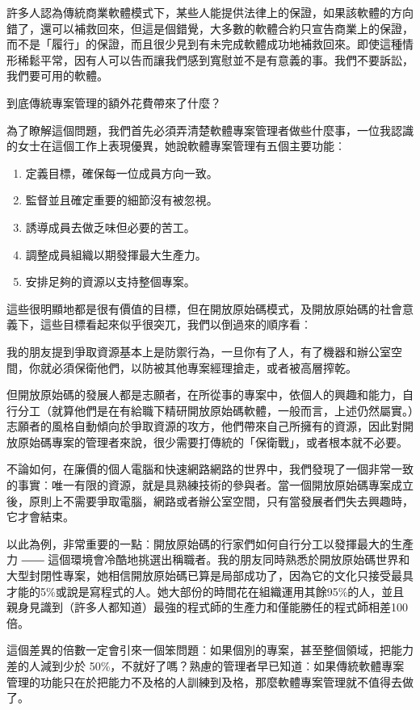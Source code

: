 \documentclass[12pt, a5paper]{book}
\begin{document}
許多人認為傳統商業軟體模式下，某些人能提供法律上的保證，如果該軟體的方向錯了，還可以補救回來，但這是個錯覺，大多數的軟體合約只宣告商業上的保證，而不是「履行」的保證，而且很少見到有未完成軟體成功地補救回來。即使這種情形稀鬆平常，因有人可以告而讓我們感到寬慰並不是有意義的事。我們不要訴訟，我們要可用的軟體。

到底傳統專案管理的額外花費帶來了什麼？

為了瞭解這個問題，我們首先必須弄清楚軟體專案管理者做些什麼事，一位我認識的女士在這個工作上表現優異，她說軟體專案管理有五個主要功能︰

\begin{enumerate}
\def\labelenumi{\arabic{enumi}.}
\itemsep1pt\parskip0pt
\item
  定義目標，確保每一位成員方向一致。
\item
  監督並且確定重要的細節沒有被忽視。
\item
  誘導成員去做乏味但必要的苦工。
\item
  調整成員組織以期發揮最大生產力。
\item
  安排足夠的資源以支持整個專案。
\end{enumerate}

這些很明顯地都是很有價值的目標，但在開放原始碼模式，及開放原始碼的社會意義下，這些目標看起來似乎很突兀，我們以倒過來的順序看︰

我的朋友提到爭取資源基本上是防禦行為，一旦你有了人，有了機器和辦公室空間，你就必須保衛他們，以防被其他專案經理搶走，或者被高層搾乾。

但開放原始碼的發展人都是志願者，在所從事的專案中，依個人的興趣和能力，自行分工（就算他們是在有給職下精研開放原始碼軟體，一般而言，上述仍然屬實。）志願者的風格自動傾向於爭取資源的攻方，他們帶來自己所擁有的資源，因此對開放原始碼專案的管理者來說，很少需要打傳統的「保衛戰」，或者根本就不必要。

不論如何，在廉價的個人電腦和快速網路網路的世界中，我們發現了一個非常一致的事實︰唯一有限的資源，就是具熟練技術的參與者。當一個開放原始碼專案成立後，原則上不需要爭取電腦，網路或者辦公室空間，只有當發展者們失去興趣時，它才會結束。

以此為例，非常重要的一點︰開放原始碼的行家們如何自行分工以發揮最大的生產力
――
這個環境會冷酷地挑選出稱職者。我的朋友同時熟悉於開放原始碼世界和大型封閉性專案，她相信開放原始碼已算是局部成功了，因為它的文化只接受最具才能的5\%或說是寫程式的人。她大部份的時間花在組織運用其餘95\%的人，並且親身見識到（許多人都知道）最強的程式師的生產力和僅能勝任的程式師相差100倍。

這個差異的倍數一定會引來一個笨問題︰如果個別的專案，甚至整個領域，把能力差的人減到少於
50\%，不就好了嗎？熟慮的管理者早已知道︰如果傳統軟體專案管理的功能只在於把能力不及格的人訓練到及格，那麼軟體專案管理就不值得去做了。
\end{document}
